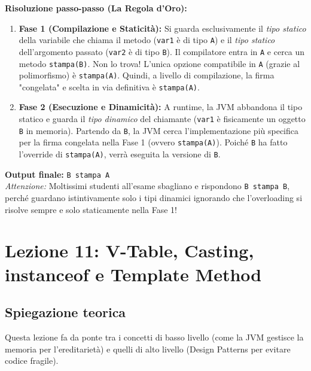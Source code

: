 \documentclass[12pt, a4paper]{article}
\begin{document}
\textbf{Risoluzione passo-passo (La Regola d'Oro):}
\begin{enumerate}
    \item \textbf{Fase 1 (Compilazione e Staticità):} Si guarda esclusivamente il \textit{tipo statico} della variabile che chiama il metodo (\texttt{var1} è di tipo \texttt{A}) e il \textit{tipo statico} dell'argomento passato (\texttt{var2} è di tipo \texttt{B}). 
    Il compilatore entra in \texttt{A} e cerca un metodo \texttt{stampa(B)}. Non lo trova! L'unica opzione compatibile in \texttt{A} (grazie al polimorfismo) è \texttt{stampa(A)}. Quindi, a livello di compilazione, la firma "congelata" e scelta in via definitiva è \texttt{stampa(A)}.
    
    \item \textbf{Fase 2 (Esecuzione e Dinamicità):} A runtime, la JVM abbandona il tipo statico e guarda il \textit{tipo dinamico} del chiamante (\texttt{var1} è fisicamente un oggetto \texttt{B} in memoria). Partendo da \texttt{B}, la JVM cerca l'implementazione più specifica per la firma congelata nella Fase 1 (ovvero \texttt{stampa(A)}). 
    Poiché \texttt{B} ha fatto l'override di \texttt{stampa(A)}, verrà eseguita la versione di \texttt{B}.
\end{enumerate}

\textbf{Output finale:} \texttt{B stampa A} \\
\textit{Attenzione:} Moltissimi studenti all'esame sbagliano e rispondono \texttt{B stampa B}, perché guardano istintivamente solo i tipi dinamici ignorando che l'overloading si risolve sempre e solo staticamente nella Fase 1!

\newpage

\section{Lezione 11: V-Table, Casting, instanceof e Template Method}

\subsection{Spiegazione teorica}
Questa lezione fa da ponte tra i concetti di basso livello (come la JVM gestisce la memoria per l'ereditarietà) e quelli di alto livello (Design Patterns per evitare codice fragile).
\end{document}
